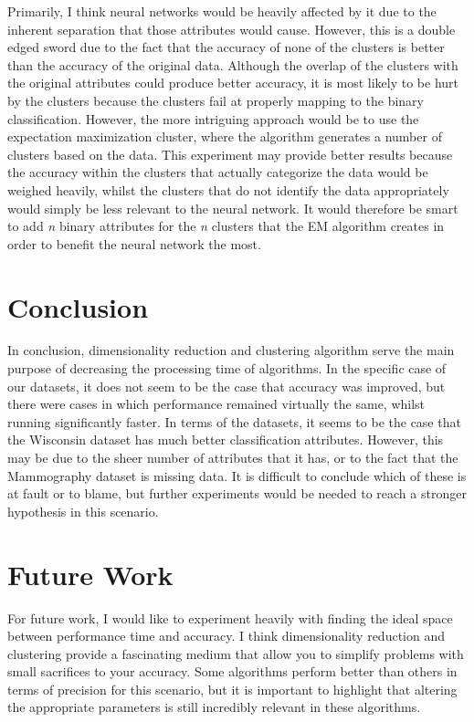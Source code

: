 \documentclass[annual]{acmsiggraph}
\begin{document}
Primarily, I think neural networks would be heavily affected by it due to the inherent separation that those attributes would cause. However, this is a double edged sword due to the fact that the accuracy of none of the clusters is better than the accuracy of the original data. Although the overlap of the clusters with the original attributes could produce better accuracy, it is most likely to be hurt by the clusters because the clusters fail at properly mapping to the binary classification. However, the more intriguing approach would be to use the expectation maximization cluster, where the algorithm generates a number of clusters based on the data. This experiment may provide better results because the accuracy within the clusters that actually categorize the data would be weighed heavily, whilst the clusters that do not identify the data appropriately would simply be less relevant to the neural network. It would therefore be smart to add \emph{n} binary attributes for the \emph{n} clusters that the EM algorithm creates in order to benefit the neural network the most.
\section{Conclusion}
In conclusion, dimensionality reduction and clustering algorithm serve the main purpose of decreasing the processing time of algorithms. In the specific case of our datasets, it does not seem to be the case that accuracy was improved, but there were cases in which performance remained virtually the same, whilst running significantly faster. In terms of the datasets, it seems to be the case that the Wisconsin dataset has much better classification attributes. However, this may be due to the sheer number of attributes that it has, or to the fact that the Mammography dataset is missing data. It is difficult to conclude which of these is at fault or to blame, but further experiments would be needed to reach a stronger hypothesis in this scenario.
\section{Future Work}
For future work, I would like to experiment heavily with finding the ideal space between performance time and accuracy. I think dimensionality reduction and clustering provide a fascinating medium that allow you to simplify problems with small sacrifices to your accuracy. Some algorithms perform better than others in terms of precision for this scenario, but it is important to highlight that altering the appropriate parameters is still incredibly relevant in these algorithms.
\end{document}

